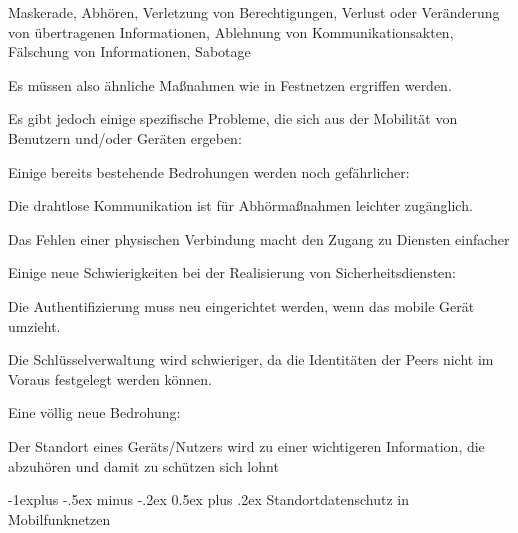 \documentclass[a4paper]{article}
\makeatletter
\renewcommand{\subsection}{\@startsection{subsection}{2}{0mm}%
 {-1explus -.5ex minus -.2ex}%
 {0.5ex plus .2ex}%
 {\normalfont\normalsize\bfseries}}
\makeatother
\begin{document}
\begin{multicols}{3}
\begin{itemize*}
\begin{itemize*}
                  \begin{itemize*}
                        \item Maskerade, Abhören, Verletzung von Berechtigungen, Verlust oder Veränderung von übertragenen Informationen, Ablehnung von Kommunikationsakten, Fälschung von Informationen, Sabotage
                        \item Es müssen also ähnliche Maßnahmen wie in Festnetzen ergriffen werden.
                  \end{itemize*}
                  \item
                  Es gibt jedoch einige spezifische Probleme, die sich aus der Mobilität
                  von Benutzern und/oder Geräten ergeben:

                  \begin{itemize*}
                        \item Einige bereits bestehende Bedrohungen werden noch gefährlicher:
                        \begin{itemize*} \item Die drahtlose Kommunikation ist für Abhörmaßnahmen leichter zugänglich. \item Das Fehlen einer physischen Verbindung macht den Zugang zu Diensten einfacher \end{itemize*}
                        \item Einige neue Schwierigkeiten bei der Realisierung von Sicherheitsdiensten:
                        \begin{itemize*} \item Die Authentifizierung muss neu eingerichtet werden, wenn das mobile Gerät umzieht. \item Die Schlüsselverwaltung wird schwieriger, da die Identitäten der Peers nicht im Voraus festgelegt werden können. \end{itemize*}
                        \item Eine völlig neue Bedrohung:
                        \begin{itemize*} \item Der Standort eines Geräts/Nutzers wird zu einer wichtigeren Information, die abzuhören und damit zu schützen sich lohnt \end{itemize*}
                  \end{itemize*}
            \end{itemize*}


            \subsection{Standortdatenschutz in
                  Mobilfunknetzen}


\end{itemize*}
\end{multicols}
\end{document}
